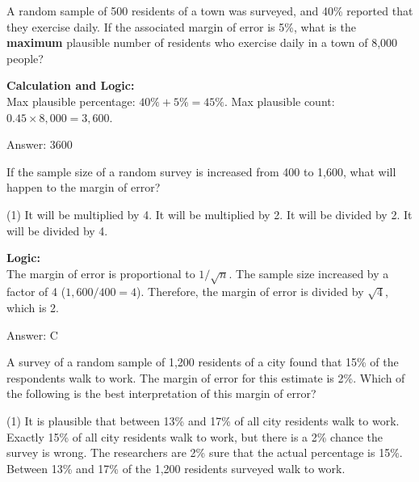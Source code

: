 \documentclass[11pt,paper=a4,answers]{exam}
\begin{document}
\begin{questions}
\vspace{60pt}

\question
A random sample of 500 residents of a town was surveyed, and 40\% reported that they exercise daily. If the associated margin of error is 5\%, what is the \textbf{maximum} plausible number of residents who exercise daily in a town of 8,000 people?

\begin{solution}
\textbf{Calculation and Logic:} \\
Max plausible percentage: $40\% + 5\% = 45\%$. Max plausible count: $0.45 \times 8,000 = 3,600$.

\vspace{30pt}

Answer: \colorbox{yellow!100}{3600}
\end{solution}

\vspace{60pt}

\question
If the sample size of a random survey is increased from 400 to 1,600, what will happen to the margin of error?
\begin{tasks}(1)
    \task It will be multiplied by 4.
    \task It will be multiplied by 2.
    \task It will be divided by 2.
    \task It will be divided by 4.
\end{tasks}

\begin{solution}
\textbf{Logic:} \\
The margin of error is proportional to $1/\sqrt{n}$. The sample size increased by a factor of 4 ($1,600 / 400 = 4$). Therefore, the margin of error is divided by $\sqrt{4}$, which is 2.

\vspace{30pt}

Answer: \colorbox{yellow!100}{C}
\end{solution}

\vspace{60pt}

\question
A survey of a random sample of 1,200 residents of a city found that 15\% of the respondents walk to work. The margin of error for this estimate is 2\%. Which of the following is the best interpretation of this margin of error?
\begin{tasks}(1)
    \task It is plausible that between 13\% and 17\% of all city residents walk to work.
    \task Exactly 15\% of all city residents walk to work, but there is a 2\% chance the survey is wrong.
    \task The researchers are 2\% sure that the actual percentage is 15\%.
    \task Between 13\% and 17\% of the 1,200 residents surveyed walk to work.
\end{tasks}


\end{questions}
\end{document}
